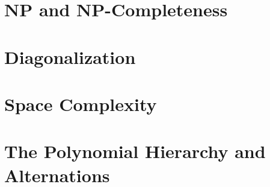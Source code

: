 \documentclass[12pt, a4paper, twoside]{article}%
\title{\mytitle}
\author{Naman Kumar}
\numberwithin{equation}{section}
\newcommand{\np}{\mathbf{NP}}
\begin{document}
	\maketitle
	\pagestyle{fancy}
	\begin{abstract}
		 The following document contains solutions to selected problems in the book `Computational Complexity' by Sanjeev Arora and Boaz Barak. Some problems which are either trivial or require nothing more than brute force/proof mirroring have been omitted.
	\end{abstract}

	\newpage
	\tableofcontents
	\newpage
	
	
	\section{$\np$ and $\np$-Completeness}
	\label{sec:introduction}
	
	
	\newpage
	\section{Diagonalization}
	\label{sec:diagonalization}
	
	
	\newpage
	\section{Space Complexity}
	\label{sec:space-complexity}
	
	
	\newpage
	\section{The Polynomial Hierarchy and Alternations}
	\label{sec:polynomial-hierarchy}
	
	



\end{document}
